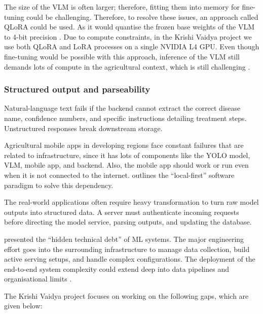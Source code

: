The size of the VLM is often larger; therefore, fitting them into memory for fine-tuning could be challenging. Therefore, to resolve these issues, an approach called QLoRA could be used. As it would quantise the frozen base weights of the VLM to 4-bit precision  \parencite{dettmers2023qlora}.
Due to compute constraints, in the Krishi Vaidya project we use both QLoRA and LoRA processes on a single NVIDIA L4 GPU.
Even though fine-tuning would be possible with this approach, inference of the VLM still demands lots of compute in the agricultural context, which is still challenging \parencite{zhuangTransferLearningSurvey2021}.

\subsubsection{Structured output and parseability}

Natural-language text fails if the backend cannot extract the correct disease
name, confidence numbers, and specific instructions detailing
treatment steps. Unstructured responses break downstream storage.

Agricultural mobile apps in developing regions face constant failures that are related to infrastructure, since it has lots of components like the YOLO model, VLM, mobile app, and backend. Also, the mobile app should work or run even when it is not connected to the internet. \textcite{kleppmannLocalFirst2019} outlines the ``local-first'' software paradigm to solve this dependency. 



 The real-world applications often require heavy transformation to turn raw model outputs into structured data. A server must authenticate incoming requests before directing the model service, parsing outputs, and updating the database. 

\textcite{sculleyMLTechDebt2015} presented the ``hidden technical debt'' of ML systems.  The major engineering effort goes into the surrounding infrastructure to manage data collection, build active serving setups, and handle complex configurations. The deployment of the end-to-end system complexity could extend deep into data pipelines and organisational limits \parencite{paleyes2022MLSystemsChallenges}. 



The Krishi Vaidya project focuses on working on the following gaps, which are given below:

